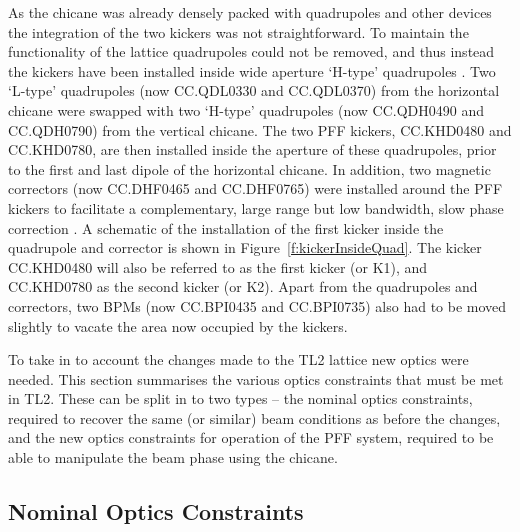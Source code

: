As the chicane was already densely packed with quadrupoles and other devices the integration of the two kickers was not straightforward. To maintain the functionality of the lattice quadrupoles could not be removed, and thus instead the kickers have been installed inside wide aperture `H-type' quadrupoles \cite{tl2Magnets}. Two `L-type'  quadrupoles \cite{tl2Magnets} (now CC.QDL0330 and CC.QDL0370) from the horizontal chicane were swapped with two `H-type' quadrupoles (now CC.QDH0490 and CC.QDH0790) from the vertical chicane. The two PFF kickers, CC.KHD0480 and CC.KHD0780, are then installed inside the aperture of these quadrupoles, prior to the first and last dipole of the horizontal chicane. In addition, two magnetic correctors (now CC.DHF0465 and CC.DHF0765) were installed around the PFF kickers to facilitate a complementary, large range but low bandwidth, slow phase correction \cite{jackLCWS14}. A schematic of the installation of the first kicker inside the quadrupole and corrector is shown in Figure~\ref{f:kickerInsideQuad}. The kicker CC.KHD0480 will also be referred to as the first kicker (or K1), and CC.KHD0780 as the second kicker (or K2). Apart from the quadrupoles and correctors, two BPMs (now CC.BPI0435 and CC.BPI0735) also had to be moved slightly to vacate the area now occupied by the kickers. %


To take in to account the changes made to the TL2 lattice new optics were needed. This section summarises the various optics constraints that must be met in TL2. These can be split in to two types -- the nominal optics constraints, required to recover the same (or similar) beam conditions as before the changes, and the new optics constraints for operation of the PFF system, required to be able to manipulate the beam phase using the chicane.

\subsection{Nominal Optics Constraints}
\label{ss:nominalOpticsReqs}


